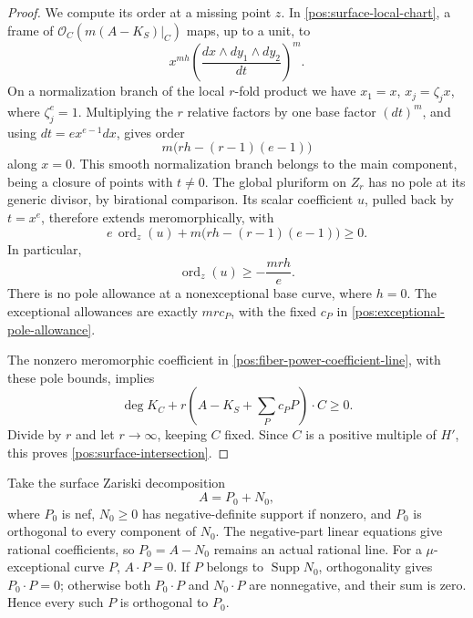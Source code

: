\documentclass[11pt,letterpaper]{article}
\newcommand{\OO}{\mathcal{O}}
\DeclareMathOperator{\Supp}{Supp}
\DeclareMathOperator{\ord}{ord}
\theoremstyle{definition}
\theoremstyle{remark}
\begin{document}
\begin{proof}
We compute its order at a missing point \(z\). In
\eqref{pos:surface-local-chart}, a frame of
\(\OO_C(m(A-K_S)|_C)\) maps, up to a unit, to
\[
 x^{mh}\left(\frac{dx\wedge dy_1\wedge dy_2}{dt}\right)^{\!m}.
\]
On a normalization branch of the local \(r\)-fold product we have
\(x_1=x\), \(x_j=\zeta_jx\), where \(\zeta_j^e=1\). Multiplying
the \(r\) relative factors by one base factor \((dt)^m\), and using
\(dt=ex^{e-1}dx\), gives order
\begin{equation}\label{pos:fiber-power-order}
 m\bigl(rh-(r-1)(e-1)\bigr)
\end{equation}
along \(x=0\). This smooth normalization branch belongs to the main
component, being a closure of points with \(t\ne0\). The global
pluriform on \(Z_r\) has no pole at its generic divisor, by birational
comparison. Its scalar coefficient \(u\), pulled back by \(t=x^e\),
therefore extends meromorphically, with
\[
 e\,\ord_z(u)+m\bigl(rh-(r-1)(e-1)\bigr)\geq0.
\]
In particular,
\begin{equation}\label{pos:fiber-power-pole-bound}
 \ord_z(u)\geq-\frac{mrh}{e}.
\end{equation}
There is no pole allowance at a nonexceptional base curve, where
\(h=0\). The exceptional allowances are exactly
\(mr c_P\), with the fixed \(c_P\) in
\eqref{pos:exceptional-pole-allowance}.

The nonzero meromorphic coefficient in
\eqref{pos:fiber-power-coefficient-line}, with these pole bounds,
implies
\[
 \deg K_C+r\left(A-K_S+\sum_Pc_PP\right)\cdot C\geq0.
\]
Divide by \(r\) and let \(r\to\infty\), keeping \(C\) fixed.
Since \(C\) is a positive multiple of \(H'\), this proves
\eqref{pos:surface-intersection}.
\end{proof}

Take the surface Zariski decomposition \cite{BHPV}
\begin{equation}\label{pos:zariski-decomposition}
 A=P_0+N_0,
\end{equation}
where \(P_0\) is nef, \(N_0\geq0\) has negative-definite support
if nonzero, and \(P_0\) is orthogonal to every component of \(N_0\).
The negative-part linear equations give rational coefficients, so
\(P_0=A-N_0\) remains an actual rational line. For a
\(\mu\)-exceptional curve \(P\), \(A\cdot P=0\). If \(P\) belongs
to \(\Supp N_0\), orthogonality gives \(P_0\cdot P=0\); otherwise
both \(P_0\cdot P\) and \(N_0\cdot P\) are nonnegative, and their
sum is zero. Hence every such \(P\) is orthogonal to \(P_0\).
\end{document}
